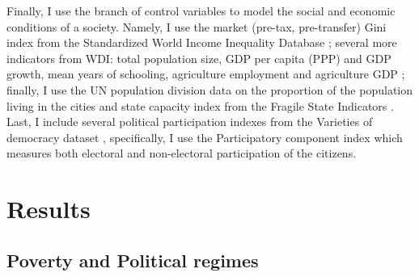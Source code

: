 \documentclass[a4paper, 12pt]{article}
\begin{document}
    Finally, I use the branch of control variables to model the social and economic conditions of a society. Namely, I use the market (pre-tax, pre-transfer) Gini index from the Standardized World Income Inequality Database \parencite{swiid}; several more indicators from WDI: total population size, GDP per capita (PPP) and GDP growth, mean years of schooling, agriculture employment and agriculture GDP \parencite{worldbank}; finally, I use the UN population division data on the proportion of the population living in the cities \parencite{un_urb} and state capacity index from the Fragile State Indicators \parencite{state_capacity}. Last, I include several political participation indexes from the Varieties of democracy dataset \parencite{VDemV10}, specifically, I use the Participatory component index which measures both electoral and non-electoral participation of the citizens. 

	
	
	\section{Results}
	
	\subsection{Poverty and Political regimes}
	
\end{document}
